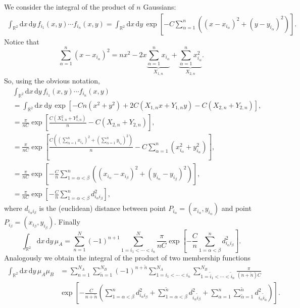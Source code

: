 \documentclass[12pt]{article}
\newcommand{\xd}{\mathrm{d}}
\numberwithin{equation}{section} %
\numberwithin{figure}{section} %
\theoremstyle{definition}
\begin{document}
We consider the integral of the product of $n$ Gaussians:
\begin{align}
\int_{{\mathbb R}^2} \xd x \, \xd y \,  f_{i_1} (x,y)\cdots f_{i_n} (x,y) = \int_{{\mathbb R}^2} \xd x \, \xd y \,  \exp \left[ -C \sum_{\alpha=1}^n \left( (x-x_{i_{\alpha}})^2 + (y-y_{i_{\alpha}})^2 \right) \right].
\end{align}
Notice that 
\begin{equation}
\sum_{\alpha=1}^n  (x-x_{i_{\alpha}})^2 = n x^2 -2x \underbrace{\sum_{\alpha=1}^n x_{i_{\alpha}} }_{X_{1,n}}+ \underbrace{\sum_{\alpha=1}^n x_{i_{\alpha}}^2}_{X_{2,n}}.
\end{equation}
So, using the obvious notation,
\begin{align}
&\int_{{\mathbb R}^2} \xd x \, \xd y \,  f_{i_1} (x,y)\cdots f_{i_n} (x,y) \nonumber\\
&= \int_{{\mathbb R}^2} \xd x  \ \xd y \, \exp \left[ -Cn(x^2+y^2) +2C(X_{1,n} x +Y_{1,n}y) - C(X_{2,n}+Y_{2,n}) \right], \nonumber\\
&= \frac{\pi}{nC} \exp \left[ \frac{C(X_{1,n}^2+Y_{1,n}^2)}{n}  - C(X_{2,n}+Y_{2,n})\right], \nonumber\\
&= \frac{\pi}{nC} \exp \left[ \frac{C(\left( \sum_{\alpha=1}^n x_{i_{\alpha}}\right)^2+\left( \sum_{\alpha=1}^n y_{i_{\alpha}}\right)^2)}{n}  - C \sum_{\alpha=1}^n (x_{i_{\alpha}}^2+y_{i_{\alpha}}^2)\right], \nonumber\\
&=  \frac{\pi}{nC} \exp \left[ - \frac{C}{n} \sum_{1=\alpha<\beta}^n \left((x_{i_\alpha}-x_{i_\beta})^2 + (y_{i_{\alpha}}-y_{i_{\beta}})^2 \right) \right], \nonumber\\
&=  \frac{\pi}{nC} \exp \left[ - \frac{C}{n} \sum_{1=\alpha < \beta}^n d_{i_{\alpha} i_{\beta}}^2 \right],
\end{align}
where $d_{i_{\alpha} i_{\beta}}$ is the (euclidean) distance between point $P_{i_{\alpha}} =(x_{i_{\alpha}} ,y_{i_{\alpha}} )$ and point $P_{i_{\beta}}=(x_{i_{\beta}},y_{i_{\beta}})$. Finally
\begin{equation}
\int_{{\mathbb R}^2} \xd x \, \xd y \, \mu_A= \sum_{n=1}^N (-1)^{n+1} \sum_{ 1=i_1< \cdots <i_n }^N \frac{\pi}{nC} \exp \left[ - \frac{C}{n} \sum_{1=\alpha < \beta}^n d_{i_{\alpha} i_{\beta}}^2 \right].
\end{equation}
Analogously we obtain the integral of the product of two membership functions
\begin{align}
\int_{{\mathbb R}^2} \xd x \, \xd y \, \mu_A \mu_B &=  \sum_{n=1}^{N_A} \sum_{\tilde{n}=1}^{N_B} (-1)^{n+\tilde{n}} \sum_{ 1=i_1< \cdots <i_n }^{N_A} \sum_{ 1=\tilde{i}_1< \cdots <\tilde{i}_n }^{N_B} \frac{\pi}{(n+\tilde{n})C}
 \nonumber\\
& \exp \left[ - \frac{C}{n+\tilde{n}} \left( \sum_{1=\alpha < \beta}^n d_{i_{\alpha} i_{\beta}}^2 + \sum_{1=\alpha < \beta}^{\tilde{n}} d_{\tilde{i}_{\alpha} \tilde{i}_{\beta}}^2 +
\sum_{\alpha=1}^n \sum_{\tilde{\alpha}=1}^{\tilde{n}} 
d_{i_{\alpha} \tilde{i}_{\tilde{\alpha}}}^2
\right) \right].
\end{align}
\end{document}
